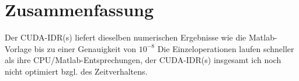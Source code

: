 \documentclass[journal]{IEEEtran}
\begin{document}
\section{Zusammenfassung}

Der CUDA-IDR(s) liefert dieselben numerischen Ergebnisse wie die Matlab-Vorlage
bis zu einer Genauigkeit von $10^{-8}$
Die Einzeloperationen laufen schneller als ihre CPU/Matlab-Entsprechungen,
der CUDA-IDR(s) insgesamt ich noch nicht optimiert bzgl. des Zeitverhaltens.



%





%
%
\end{document}
